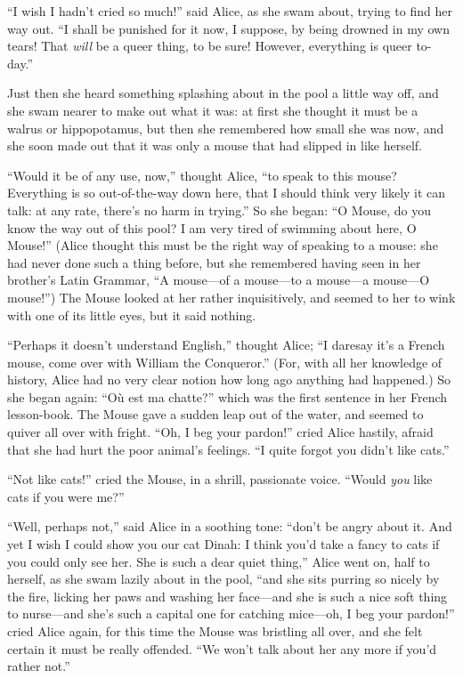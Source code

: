 \documentclass[book, 20pt]{extbook}
\begin{document}
``I wish I hadn't cried so much!'' said Alice, as she swam about, trying
to find her way out. ``I shall be punished for it now, I suppose, by
being drowned in my own tears! That \emph{will} be a queer thing, to be
sure! However, everything is queer to-day.''

Just then she heard something splashing about in the pool a little way
off, and she swam nearer to make out what it was: at first she thought
it must be a walrus or hippopotamus, but then she remembered how small
she was now, and she soon made out that it was only a mouse that had
slipped in like herself.

``Would it be of any use, now,'' thought Alice, ``to speak to this
mouse? Everything is so out-of-the-way down here, that I should think
very likely it can talk: at any rate, there's no harm in trying.'' So
she began: ``O Mouse, do you know the way out of this pool? I am very
tired of swimming about here, O Mouse!'' (Alice thought this must be the
right way of speaking to a mouse: she had never done such a thing
before, but she remembered having seen in her brother's Latin Grammar,
``A mouse---of a mouse---to a mouse---a mouse---O mouse!'') The Mouse
looked at her rather inquisitively, and seemed to her to wink with one
of its little eyes, but it said nothing.

``Perhaps it doesn't understand English,'' thought Alice; ``I daresay
it's a French mouse, come over with William the Conqueror.'' (For, with
all her knowledge of history, Alice had no very clear notion how long
ago anything had happened.) So she began again: ``Où est ma chatte?''
which was the first sentence in her French lesson-book. The Mouse gave a
sudden leap out of the water, and seemed to quiver all over with fright.
``Oh, I beg your pardon!'' cried Alice hastily, afraid that she had hurt
the poor animal's feelings. ``I quite forgot you didn't like cats.''

``Not like cats!'' cried the Mouse, in a shrill, passionate voice.
``Would \emph{you} like cats if you were me?''

``Well, perhaps not,'' said Alice in a soothing tone: ``don't be angry
about it. And yet I wish I could show you our cat Dinah: I think you'd
take a fancy to cats if you could only see her. She is such a dear quiet
thing,'' Alice went on, half to herself, as she swam lazily about in the
pool, ``and she sits purring so nicely by the fire, licking her paws and
washing her face---and she is such a nice soft thing to nurse---and
she's such a capital one for catching mice---oh, I beg your pardon!''
cried Alice again, for this time the Mouse was bristling all over, and
she felt certain it must be really offended. ``We won't talk about her
any more if you'd rather not.''
\end{document}

